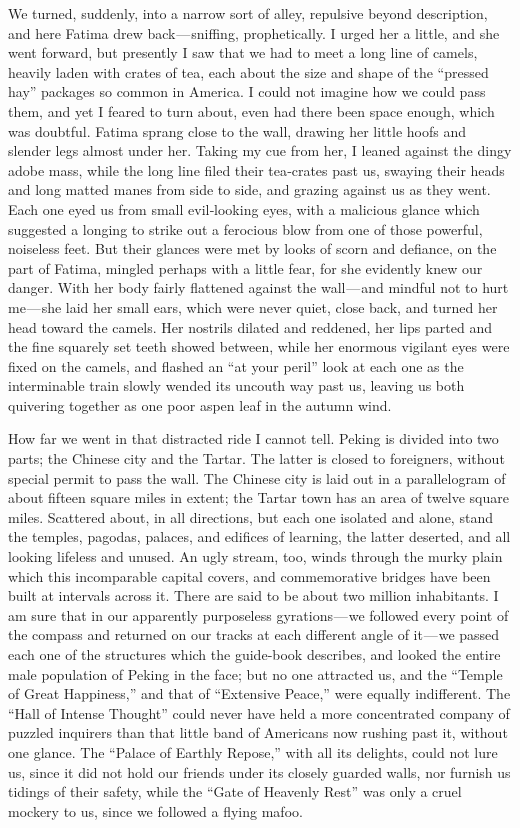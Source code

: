 \documentclass[12pt]{book}
\begin{document}
We turned, suddenly, into a narrow sort of alley, repulsive beyond description,
and here Fatima drew back — sniffing, prophetically. I urged her a little, and she
went forward, but presently I saw that we had to meet a long line of camels,
heavily laden with crates of tea, each about the size and shape of the “pressed hay”
packages so common in America. I could not imagine how we could pass them,
and yet I feared to turn about, even had there been space enough, which was
doubtful. Fatima sprang close to the wall, drawing her little hoofs and slender legs
almost under her. Taking my cue from her, I leaned against the dingy adobe mass,
while the long line filed their tea‐crates past us, swaying their heads and long
matted manes from side to side, and grazing against us as they went. Each one
eyed us from small evil‐looking eyes, with a malicious glance which suggested a
longing to strike out a ferocious blow from one of those powerful, noiseless feet.
But their glances were met by looks of scorn and defiance, on the part of Fatima,
mingled perhaps with a little fear, for she evidently knew our danger. With her
body fairly flattened against the wall — and mindful not to hurt me — she laid her
small ears, which were never quiet, close back, and turned her head toward the
camels. Her nostrils dilated and reddened, her lips parted and the fine squarely
set teeth showed between, while her enormous vigilant eyes were fixed on the
camels, and flashed an “at your peril” look at each one as the interminable train
slowly wended its uncouth way past us, leaving us both quivering together as
one poor aspen leaf in the autumn wind.

How far we went in that distracted ride I cannot tell. Peking is divided into two
parts; the Chinese city and the Tartar. The latter is closed to foreigners, without
special permit to pass the wall. The Chinese city is laid out in a parallelogram of
about fifteen square miles in extent; the Tartar town has an area of twelve square
miles. Scattered about, in all directions, but each one isolated and alone, stand
the temples, pagodas, palaces, and edifices of learning, the latter deserted, and all
looking lifeless and unused. An ugly stream, too, winds through the murky plain
which this incomparable capital covers, and commemorative bridges have been
built at intervals across it. There are said to be about two million inhabitants. I am
sure that in our apparently purposeless gyrations — we followed every point of
the compass and returned on our tracks at each different angle of it — we passed
each one of the structures which the guide‐book describes, and looked the entire
male population of Peking in the face; but no one attracted us, and the “Temple
of Great Happiness,” and that of “Extensive Peace,” were equally indifferent. The
“Hall of Intense Thought” could never have held a more concentrated company of
puzzled inquirers than that little band of Americans now rushing past it, without
one glance. The “Palace of Earthly Repose,” with all its delights, could not lure
us, since it did not hold our friends under its closely guarded walls, nor furnish
us tidings of their safety, while the “Gate of Heavenly Rest” was only a cruel
mockery to us, since we followed a flying mafoo.
\end{document}
